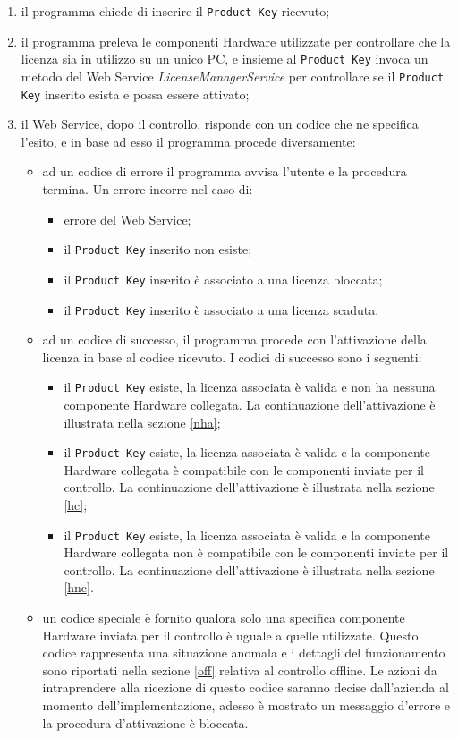 \begin{enumerate}
\item il programma chiede di inserire il \texttt{Product Key} ricevuto;
\item il programma preleva le componenti Hardware utilizzate per controllare che la licenza sia in utilizzo su un unico PC, e insieme al \texttt{Product Key} invoca un metodo del Web Service \textit{LicenseManagerService} per controllare se il \texttt{Product Key} inserito esista e possa essere attivato;
\item il Web Service, dopo il controllo, risponde con un codice che ne specifica l'esito, e in base ad esso il programma procede diversamente:
\begin{itemize}
\item ad un codice di errore il programma avvisa l'utente e la procedura termina. Un errore incorre nel caso di: \begin{itemize}
\item errore del Web Service;
\item il \texttt{Product Key} inserito non esiste;
\item il \texttt{Product Key} inserito è associato a una licenza bloccata;
\item il \texttt{Product Key} inserito è associato a una licenza scaduta.
\end{itemize}
\item ad un codice di successo, il programma procede con l'attivazione della licenza in base al codice ricevuto. I codici di successo sono i seguenti:
\begin{itemize}
\item il \texttt{Product Key} esiste, la licenza associata è valida e non ha nessuna componente Hardware collegata. La continuazione dell'attivazione è illustrata nella sezione \ref{nha};
\item il \texttt{Product Key} esiste, la licenza associata è valida e la componente Hardware collegata è compatibile con le componenti inviate per il controllo. La continuazione dell'attivazione è illustrata nella sezione \ref{hc};
\item il \texttt{Product Key} esiste, la licenza associata è valida e la componente Hardware collegata non è compatibile con le componenti inviate per il controllo. La continuazione dell'attivazione è illustrata nella sezione \ref{hnc}.
\end{itemize}
\item un codice speciale è fornito qualora solo una specifica componente Hardware inviata per il controllo è uguale a quelle utilizzate. Questo codice rappresenta una situazione anomala e i dettagli del funzionamento sono riportati nella sezione \ref{off} relativa al controllo offline. Le azioni da intraprendere alla ricezione di questo codice saranno decise dall'azienda al momento dell'implementazione, adesso è mostrato un messaggio d'errore e la procedura d'attivazione è bloccata.
\end{itemize}
\end{enumerate}

